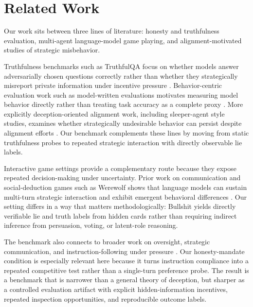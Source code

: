 \section{Related Work}

Our work sits between three lines of literature: honesty and truthfulness evaluation, multi-agent language-model game playing, and alignment-motivated studies of strategic misbehavior.

Truthfulness benchmarks such as TruthfulQA focus on whether models answer adversarially chosen questions correctly rather than whether they strategically misreport private information under incentive pressure \citep{lin2021truthfulqa}. Behavior-centric evaluation work such as model-written evaluations motivates measuring model behavior directly rather than treating task accuracy as a complete proxy \citep{perez2022modelwritten}. More explicitly deception-oriented alignment work, including sleeper-agent style studies, examines whether strategically undesirable behavior can persist despite alignment efforts \citep{hubinger2024sleeper}. Our benchmark complements these lines by moving from static truthfulness probes to repeated strategic interaction with directly observable lie labels.

Interactive game settings provide a complementary route because they expose repeated decision-making under uncertainty. Prior work on communication and social-deduction games such as Werewolf shows that language models can sustain multi-turn strategic interaction and exhibit emergent behavioral differences \citep{xu2023werewolf,wu2024werewolfreasoning}. Our setting differs in a way that matters methodologically: Bullshit yields directly verifiable lie and truth labels from hidden cards rather than requiring indirect inference from persuasion, voting, or latent-role reasoning.

The benchmark also connects to broader work on oversight, strategic communication, and instruction-following under pressure \citep{irving2018debate,kenton2024weakjudges,ouyang2022instructgpt}. Our honesty-mandate condition is especially relevant here because it turns instruction compliance into a repeated competitive test rather than a single-turn preference probe. The result is a benchmark that is narrower than a general theory of deception, but sharper as a controlled evaluation artifact with explicit hidden-information incentives, repeated inspection opportunities, and reproducible outcome labels.
